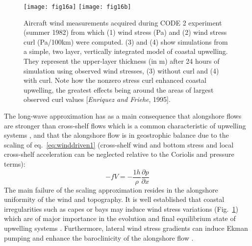 \begin{figure}
  \centering
  \texttt{[image: fig16a]}
  \texttt{[image: fig16b]}
  \caption{Aircraft wind measurements acquired during CODE 2
  experiment (summer 1982) from which (1) wind stress (Pa) and (2)
  wind stress curl (Pa/100km) were computed. (3) and (4) show
  simulations from a simple, two layer, vertically integrated
  model of coastal upwelling. They represent the upper-layer
  thickness (in m) after 24 hours of simulation using observed
  wind stresses, (3) without curl and (4) with curl. Note how the
  nonzero stress curl enhanced coastal upwelling, the greatest
  effects being around the areas of largest observed curl values
  [{\it Enriquez and Friehe}, 1995].}
  \label{fig:capewind}
\end{figure}


The long-wave approximation has as a main consequence that
alongshore flows are stronger than cross-shelf flows which is a
common characteristic of upwelling systems
\citep[e.g.][]{Batteen97}, and that the alongshore flow is in
geostrophic balance due to the scaling of eq.~\ref{eq:winddriven1}
(cross-shelf wind and bottom stress and local cross-shelf
acceleration can be neglected relative to the Coriolis and
pressure terms):
\begin{equation}\label{eq:geost}
  -fV=-\frac{1h}{\rho}\frac{\partial p}{\partial x}
\end{equation}
The main failure of the scaling approximation resides in the
alongshore uniformity of the wind and topography. It is well
established that coastal irregularities such as capes or bays may
induce wind stress variations (Fig.~\ref{fig:capewind}) which are
of major importance in the evolution and final equilibrium state
of upwelling systems \citep[e.g.][]{Haynes93,Enriquez95}.
Furthermore, lateral wind stress gradients can induce Ekman
pumping and enhance the baroclinicity of the alongshore flow
\citep{Brink87,Batteen92}.

